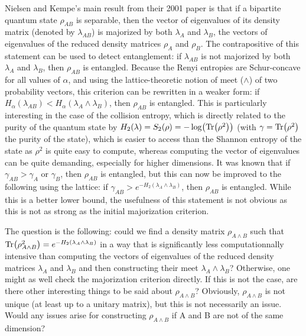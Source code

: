 Nielsen and Kempe's main result from their 2001 paper is that if a bipartite quantum state $\rho_{AB}$ is separable, then the vector of eigenvalues of its density matrix (denoted by $\lambda_{AB}$) is majorized by both $\lambda_A$ and $\lambda_B$, the vectors of eigenvalues of the reduced density matrices $\rho_A$ and $\rho_B$. The contrapositive of this statement can be used to detect entanglement: if $\lambda_{AB}$ is not majorized by both $\lambda_A$ and $\lambda_B$, then $\rho_{AB}$ is entangled. Because the Renyi entropies are Schur-concave for all values of $\alpha$, and using the lattice-theoretic notion of meet ($\wedge$) of two probability vectors, this criterion can be rewritten in a weaker form: if $H_\alpha(\lambda_{AB}) < H_\alpha(\lambda_A \wedge \lambda_B)$, then $\rho_{AB}$ is entangled. This is particularly interesting in the case of the collision entropy, which is directly related to the purity of the quantum state by $H_2(\lambda) = S_2(\rho) = -\log(\Tr(\rho^2))$ (with $\gamma = \Tr(\rho^2)$ the purity of the state), which is easier to access than the Shannon entropy of the state as $\rho^2$ is quite easy to compute, whereas computing the vector of eigenvalues can be quite demanding, especially for higher dimensions. It was known that if $\gamma_{AB} > \gamma_A$ or $\gamma_B$, then $\rho_{AB}$ is entangled, but this can now be improved to the following using the lattice: if $\gamma_{AB} > e^{-H_2(\lambda_A \wedge \lambda_B)}$, then $\rho_{AB}$ is entangled. While this is a better lower bound, the usefulness of this statement is not obvious as this is not as strong as the initial majorization criterion.

The question is the following: could we find a density matrix $\rho_{A \wedge B}$ such that $\Tr(\rho^2_{A \wedge B}) = e^{-H_2(\lambda_A \wedge \lambda_B)}$ in a way that is significantly less computationnally intensive than computing the vectors of eigenvalues of the reduced density matrices $\lambda_A$ and $\lambda_B$ and then constructing their meet $\lambda_A \wedge \lambda_B$? Otherwise, one might as well check the majorization criterion directly. If this is not the case, are there other interesting things to be said about $\rho_{A \wedge B}$? Obviously, $\rho_{A \wedge B}$ is not unique (at least up to a unitary matrix), but this is not necessarily an issue. Would any issues arise for constructing $\rho_{A \wedge B}$ if A and B are not of the same dimension?